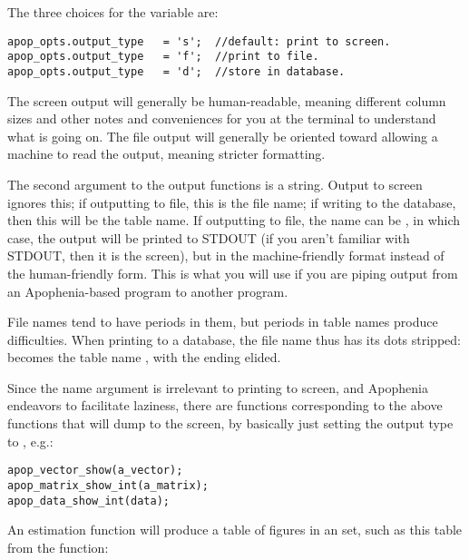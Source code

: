 The three choices for the  
variable are:
\begin{lstlisting}
apop_opts.output_type   = 's';  //default: print to screen.
apop_opts.output_type   = 'f';  //print to file.
apop_opts.output_type   = 'd';  //store in database.
\end{lstlisting}

The screen output will generally be human-readable, meaning different
column sizes and other notes and conveniences for you at the terminal to
understand what is going on. The file output will generally be oriented
toward allowing a machine to read the output, meaning stricter formatting.

The second argument to the output functions is a string.  Output to
screen ignores this; if outputting to file, this is the file name;
if writing to the database, then this will be the table name.
If outputting to file, the name can be , in which case, the
output will be printed to STDOUT (if you aren't familiar with STDOUT,
then it is the screen), but in the machine-friendly format instead of
the human-friendly form. This is what you will use if you are piping
output from an Apophenia-based program to another program.

File names tend to have periods in them, but periods in table names
produce difficulties.  When printing to a database, the file name thus
has its dots stripped:  becomes the table name
, with the ending elided.

Since the name argument is irrelevant to printing to screen, and
Apophenia endeavors to facilitate laziness, there are functions
corresponding to the above  functions that will
dump to the screen, by basically just setting the output type to , e.g.:
 
 
 
 
\begin{lstlisting}
apop_vector_show(a_vector);
apop_matrix_show_int(a_matrix);
apop_data_show_int(data);
\end{lstlisting}

An estimation function will produce a table of figures in an
 set, such as this table from the 
function:

